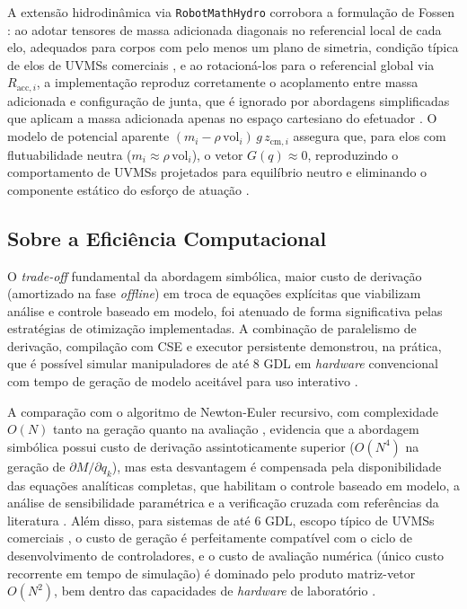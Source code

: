 A extensão hidrodinâmica via \texttt{RobotMathHydro} corrobora a formulação de Fossen \cite{fossen2011handbook}: ao adotar tensores de massa adicionada diagonais no referencial local de cada elo, adequados para corpos com pelo menos um plano de simetria, condição típica de elos de UVMSs comerciais \cite{antonelli2014modelling}, e ao rotacioná-los para o referencial global via $R_{\text{acc},i}$, a implementação reproduz corretamente o acoplamento entre massa adicionada e configuração de junta, que é ignorado por abordagens simplificadas que aplicam a massa adicionada apenas no espaço cartesiano do efetuador \cite{yuh2001underwater}. O modelo de potencial aparente $(m_i - \rho\,\text{vol}_i)\,g\,z_{\text{cm},i}$ assegura que, para elos com flutuabilidade neutra ($m_i \approx \rho\,\text{vol}_i$), o vetor $G(q) \approx 0$, reproduzindo o comportamento de UVMSs projetados para equilíbrio neutro e eliminando o componente estático do esforço de atuação \cite{newman1977marine, antonelli2014modelling}.

\subsection{Sobre a Eficiência Computacional}

O \textit{trade-off} fundamental da abordagem simbólica, maior custo de derivação (amortizado na fase \textit{offline}) em troca de equações explícitas que viabilizam análise e controle baseado em modelo, foi atenuado de forma significativa pelas estratégias de otimização implementadas. A combinação de paralelismo de derivação, compilação com CSE e executor persistente demonstrou, na prática, que é possível simular manipuladores de até 8 GDL em \textit{hardware} convencional com tempo de geração de modelo aceitável para uso interativo \cite{leu1986automated, hollerbach1980recursive}.

A comparação com o algoritmo de Newton-Euler recursivo, com complexidade $O(N)$ tanto na geração quanto na avaliação \cite{luh1980online}, evidencia que a abordagem simbólica possui custo de derivação assintoticamente superior ($O(N^4)$ na geração de $\partial M/\partial q_k$), mas esta desvantagem é compensada pela disponibilidade das equações analíticas completas, que habilitam o controle baseado em modelo, a análise de sensibilidade paramétrica e a verificação cruzada com referências da literatura \cite{siciliano2009robotics, corke2017robotics}. Além disso, para sistemas de até 6 GDL, escopo típico de UVMSs comerciais \cite{antonelli2014modelling}, o custo de geração é perfeitamente compatível com o ciclo de desenvolvimento de controladores, e o custo de avaliação numérica (único custo recorrente em tempo de simulação) é dominado pelo produto matriz-vetor $O(N^2)$, bem dentro das capacidades de \textit{hardware} de laboratório \cite{golub2013matrix}.

